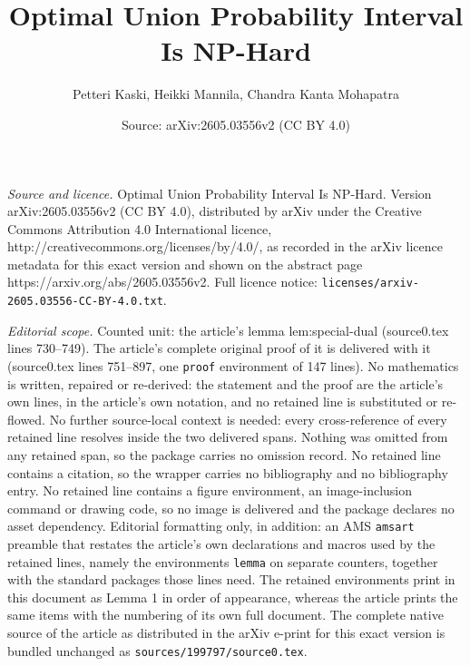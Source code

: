 \documentclass[10pt,a4paper]{amsart}
\title{Optimal Union Probability Interval Is NP-Hard}
\author{Petteri Kaski, Heikki Mannila, Chandra Kanta Mohapatra}
\date{Source: arXiv:2605.03556v2 (CC BY 4.0)}
\begin{document}
\maketitle

\noindent\emph{Source and licence.} Optimal Union Probability Interval Is NP-Hard. Version arXiv:2605.03556v2 (CC BY 4.0), distributed by arXiv under the Creative Commons Attribution 4.0 International licence, http://creativecommons.org/licenses/by/4.0/, as recorded in the arXiv licence metadata for this exact version and shown on the abstract page https://arxiv.org/abs/2605.03556v2. Full licence notice: \texttt{licenses/arxiv-2605.03556-CC-BY-4.0.txt}.\par\smallskip

\noindent\textit{Editorial scope.} Counted unit: the article's lemma lem:special-dual (source0.tex lines 730--749). The article's complete original proof of it is delivered with it (source0.tex lines 751--897, one \texttt{proof} environment of 147 lines). No mathematics is written, repaired or re-derived: the statement and the proof are the article's own lines, in the article's own notation, and no retained line is substituted or re-flowed.  No further source-local context is needed: every cross-reference of every retained line resolves inside the two delivered spans.  Nothing was omitted from any retained span, so the package carries no omission record.  No retained line contains a citation, so the wrapper carries no bibliography and no bibliography entry.  No retained line contains a figure environment, an image-inclusion command or drawing code, so no image is delivered and the package declares no asset dependency.  Editorial formatting only, in addition: an AMS \texttt{amsart} preamble that restates the article's own declarations and macros used by the retained lines, namely the environments \texttt{lemma} on separate counters, together with the standard packages those lines need.  The retained environments print in this document as Lemma 1 in order of appearance, whereas the article prints the same items with the numbering of its own full document.  The complete native source of the article as distributed in the arXiv e-print for this exact version is bundled unchanged as \texttt{sources/199797/source0.tex}.
\end{document}
